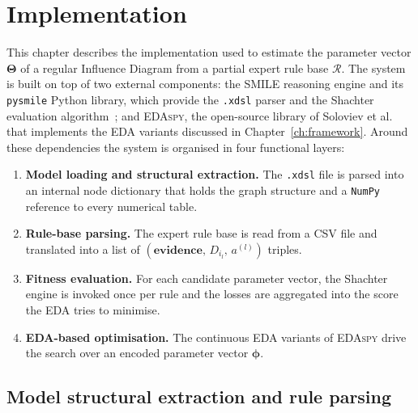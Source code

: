 
\chapter{Implementation}
\label{ch:implementation}

This chapter describes the implementation used to estimate the parameter vector $\boldsymbol{\Theta}$ of a regular
Influence Diagram from a partial expert rule base $\mathcal{R}$.
The system is built on top of two external components: the
\textsc{SMILE} reasoning engine and its \texttt{pysmile} Python library,
which provide the \texttt{.xdsl} parser and the Shachter evaluation
algorithm~\cite{shachter1986evaluating,genie}; and
\textsc{EDAspy}, the open-source library of Soloviev et al.~\cite{soloviev2024edaspy} that implements the EDA variants
discussed in Chapter~\ref{ch:framework}. Around these dependencies the
system is organised in four functional layers:

\begin{enumerate}
    \item \textbf{Model loading and structural extraction.}
          The \texttt{.xdsl} file is parsed into an internal node
          dictionary that holds the graph structure and a
          \texttt{NumPy} reference to every numerical table.
    \item \textbf{Rule-base parsing.}
          The expert rule base is read from a CSV file and translated
          into a list of $(\mathbf{evidence},\, D_{i_l},\, a^{(l)})$
          triples.
    \item \textbf{Fitness evaluation.}
          For each candidate parameter vector, the Shachter engine is
          invoked once per rule and the losses are aggregated
          into the score the EDA tries to minimise.
    \item \textbf{EDA-based optimisation.}
          The continuous EDA variants of \textsc{EDAspy} drive
          the search over an encoded parameter vector
          $\boldsymbol{\phi}$.
\end{enumerate}



\section{Model structural extraction and rule parsing}

